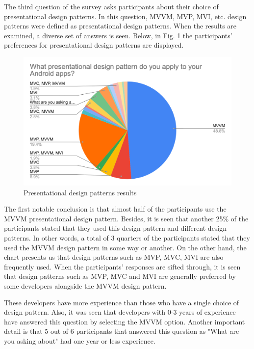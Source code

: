 The third question of the survey asks participants about their choice of presentational design patterns. In this question, MVVM, MVP, MVI, etc. design patterns were defined as presentational design patterns. When the results are  examined, a diverse set of answers is seen. Below, in Fig. \ref{fig:design_pattern} the participants' preferences for presentational design patterns are displayed.
\begin{figure}[ht!]
    \centering
    \includegraphics[scale=0.3]{figures/survey_q3_design_pattern.png}
    \caption{Presentational design patterns results}
    \label{fig:design_pattern}
\end{figure}
\FloatBarrier
The first notable conclusion is that almost half of the participants use the MVVM presentational design pattern. Besides, it is seen that another 25\% of the participants stated that they used this design pattern and different design patterns. In other words, a total of 3 quarters of the participants stated that they used the MVVM design pattern in some way or another. On the other hand, the chart presents us that design patterns such as MVP, MVC, MVI are also frequently used. When the participants' responses are sifted through, it is seen that design patterns such as MVP, MVC and MVI are generally preferred by some developers alongside the MVVM design pattern. 

These developers have more experience than those who have a single choice of design pattern. Also, it was seen that developers with 0-3 years of experience have answered this question by selecting the MVVM option. Another important detail is that 5 out of 6 participants that answered this question as "What are you asking about" had one year or less experience.

